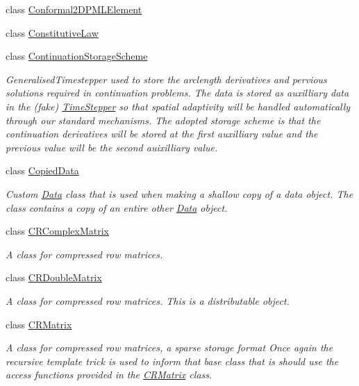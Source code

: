 \begin{DoxyCompactItemize}
class \hyperlink{classoomph_1_1Conformal2DPMLElement}{Conformal2\+D\+P\+M\+L\+Element}
\item 
class \hyperlink{classoomph_1_1ConstitutiveLaw}{Constitutive\+Law}
\item 
class \hyperlink{classoomph_1_1ContinuationStorageScheme}{Continuation\+Storage\+Scheme}
\begin{DoxyCompactList}\small\item\em Generalised\+Timestepper used to store the arclength derivatives and pervious solutions required in continuation problems. The data is stored as auxilliary data in the (fake) \hyperlink{classoomph_1_1TimeStepper}{Time\+Stepper} so that spatial adaptivity will be handled automatically through our standard mechanisms. The adopted storage scheme is that the continuation derivatives will be stored at the first auxilliary value and the previous value will be the second auixilliary value. \end{DoxyCompactList}\item 
class \hyperlink{classoomph_1_1CopiedData}{Copied\+Data}
\begin{DoxyCompactList}\small\item\em Custom \hyperlink{classoomph_1_1Data}{Data} class that is used when making a shallow copy of a data object. The class contains a copy of an entire other \hyperlink{classoomph_1_1Data}{Data} object. \end{DoxyCompactList}\item 
class \hyperlink{classoomph_1_1CRComplexMatrix}{C\+R\+Complex\+Matrix}
\begin{DoxyCompactList}\small\item\em A class for compressed row matrices. \end{DoxyCompactList}\item 
class \hyperlink{classoomph_1_1CRDoubleMatrix}{C\+R\+Double\+Matrix}
\begin{DoxyCompactList}\small\item\em A class for compressed row matrices. This is a distributable object. \end{DoxyCompactList}\item 
class \hyperlink{classoomph_1_1CRMatrix}{C\+R\+Matrix}
\begin{DoxyCompactList}\small\item\em A class for compressed row matrices, a sparse storage format Once again the recursive template trick is used to inform that base class that is should use the access functions provided in the \hyperlink{classoomph_1_1CRMatrix}{C\+R\+Matrix} class. \end{DoxyCompactList}\item 

\end{DoxyCompactItemize}
